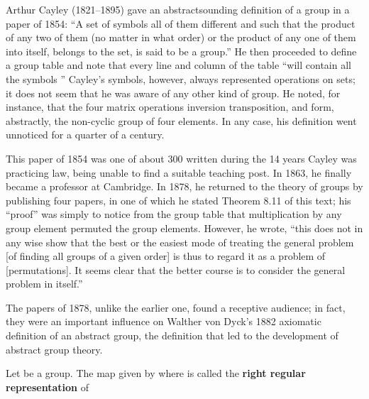 \documentclass[11pt,oneside]{article}
\begin{document}
\begin{BookBody}

 \BookEnd{\blacksquare}

\noindent Arthur Cayley (1821–1895) gave an abstractsounding definition of a group in a paper of 1854: “A set of symbols all of them different and such that the product of any two of them (no matter in what order) or the product of any one of them into itself, belongs to the set, is said to be a group.” He then proceeded to define a group table and note that every line and column of the table “will contain all the symbols  ” Cayley’s symbols, however, always represented operations on sets; it does not seem that he was aware of any other kind of group. He noted, for instance, that the four matrix operations  inversion\BookInline{,\allowbreak \beta = } transposition, and \BookInline{\gamma = \alpha \beta,\allowbreak } form, abstractly, the non-cyclic group of four elements. In any case, his definition went unnoticed for a quarter of a century.

\noindent This paper of 1854 was one of about 300 written during the 14 years Cayley was practicing law, being unable to find a suitable teaching post. In 1863, he finally became a professor at Cambridge. In 1878, he returned to the theory of groups by publishing four papers, in one of which he stated Theorem 8.11 of this text; his “proof” was simply to notice from the group table that multiplication by any group element permuted the group elements. However, he wrote, “this does not in any wise show that the best or the easiest mode of treating the general problem [of finding all groups of a given order] is thus to regard it as a problem of [permutations]. It seems clear that the better course is to consider the general problem in itself.”

The papers of 1878, unlike the earlier one, found a receptive audience; in fact, they were an important influence on Walther von Dyck’s 1882 axiomatic definition of an abstract group, the definition that led to the development of abstract group theory.

 Let  be a group. The map  given by  where  is called the\textbf{ right regular representation} of \BookEnd{\blacksquare}


\end{BookBody}
\end{document}
